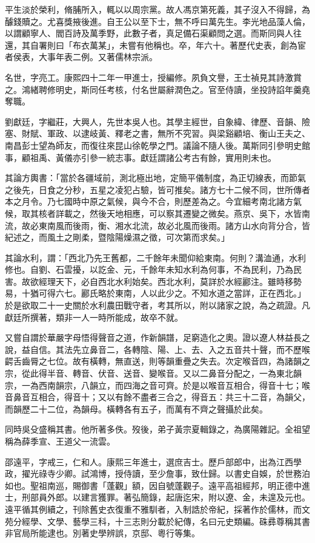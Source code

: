 \begin{pinyinscope}
平生淡於榮利，脩脯所入，輒以以周宗黨。故人馮京第死義，其子沒入不得歸，為醵錢贖之。尤喜獎掖後進。自王公以至下士，無不呼曰萬先生。李光地品藻人倫，以謂顧寧人、閻百詩及萬季野，此數子者，真足備石渠顧問之選。而斯同與人往還，其自署則曰「布衣萬某」，未嘗有他稱也。卒，年六十。著歷代史表，創為宦者侯表，大事年表二例。又著儒林宗派。

名世，字亮工。康熙四十二年一甲進士，授編修。夙負文譽，王士禎見其詩激賞之。鴻緒聘修明史，斯同任考核，付名世屬辭潤色之。官至侍讀，坐投詩諂年羹堯奪職。

劉獻廷，字繼莊，大興人，先世本吳人也。其學主經世，自象緯、律歷、音韻、險塞、財賦、軍政、以逮岐黃、釋老之書，無所不究習。與梁谿顧培、衡山王夫之、南昌彭士望為師友，而復往來昆山徐乾學之門。議論不隨人後。萬斯同引參明史館事，顧祖禹、黃儀亦引參一統志事。獻廷謂諸公考古有餘，實用則未也。

其論方輿書：「當於各疆域前，測北極出地，定簡平儀制度，為正切線表，而節氣之後先，日食之分秒，五星之凌犯占驗，皆可推矣。諸方七十二候不同，世所傳者本之月令。乃七國時中原之氣候，與今不合，則歷差為之。今宜細考南北諸方氣候，取其核者詳載之，然後天地相應，可以察其遷變之微矣。燕京、吳下，水皆南流，故必東南風而後雨，衡、湘水北流，故必北風而後雨。諸方山水向背分合，皆紀述之，而風土之剛柔，暨陰陽燥濕之徵，可次第而求矣。」

其論水利，謂：「西北乃先王舊都，二千餘年未聞仰給東南。何則？溝洫通，水利修也。自劉、石雲擾，以訖金、元，千餘年未知水利為何事，不為民利，乃為民害。故欲經理天下，必自西北水利始矣。西北水利，莫詳於水經酈注。雖時移勢易，十猶可得六七。酈氏略於東南，人以此少之。不知水道之當詳，正在西北。」於是欲取二十一史關於水利農田戰守者，考其所以，附以諸家之說，為之疏證。凡獻廷所撰著，類非一人一時所能成，故卒不就。

又嘗自謂於華嚴字母悟得聲音之道，作新韻譜，足窮造化之奧。證以遼人林益長之說，益自信。其法先立鼻音二，各轉陰、陽、上、去、入之五音共十聲，而不歷喉齶舌齒脣之七位。故有橫轉，無直送，則等韻重疊之失去。次定喉音四，為諸韻之宗，從此得半音、轉音、伏音、送音、變喉音。又以二鼻音分配之，一為東北韻宗，一為西南韻宗，八韻立，而四海之音可齊。於是以喉音互相合，得音十七；喉音鼻音互相合，得音十；又以有餘不盡者三合之，得音五：共三十二音，為韻父，而韻歷二十二位，為韻母。橫轉各有五子，而萬有不齊之聲攝於此矣。

同時吳殳盛稱其書。他所著多佚。歿後，弟子黃宗夏輯錄之，為廣陽雜記。全祖望稱為薛季宣、王道父一流雲。

邵遠平，字戒三，仁和人。康熙三年進士，選庶吉士。歷戶部郎中，出為江西學政，擢光祿寺少卿。試鴻博，授侍讀，至少詹事，致仕歸。以書史自娛，於世務泊如也。聖祖南巡，賜御書「蓬觀」額，因自號蓬觀子。遠平高祖經邦，明正德中進士，刑部員外郎。以建言獲罪。著弘簡錄，起唐迄宋，附以遼、金，未遑及元也。遠平循其例續之，刊除舊史衣復重不雅馴者，入制誥於帝紀，採著作於儒林，而文苑分經學、文學、藝學三科，十三志則分載於紀傳，名曰元史類編。硃彞尊稱其書非官局所能逮也。別著史學辨誤，京邸、粵行等集。


\end{pinyinscope}
